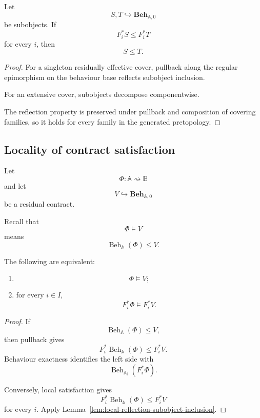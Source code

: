 \begin{lemma}
\label{lem:local-reflection-subobject-inclusion}
Let
\[
    S,T
    \hookrightarrow
    \mathbf{Beh}_{\mathbb A,0}
\]
be subobjects. If
\[
    F_i^\ast S
    \leq
    F_i^\ast T
\]
for every \(i\), then
\[
    S\leq T.
\]
\end{lemma}

\begin{proof}
For a singleton residually effective cover, pullback along the regular
epimorphism on the behaviour base reflects subobject inclusion.

For an extensive cover, subobjects decompose componentwise.

The reflection property is preserved under pullback and composition of
covering families, so it holds for every family in the generated
pretopology.
\end{proof}

\subsection{Locality of contract satisfaction}
\label{subsec:locality-contract-satisfaction-rigorous}

Let
\[
    \Phi:\mathbb A\rightsquigarrow\mathbb B
\]
and let
\[
    V\hookrightarrow\mathbf{Beh}_{\mathbb A,0}
\]
be a residual contract.

Recall that
\[
    \Phi\models V
\]
means
\[
    \operatorname{Beh}_{\mathbb A}(\Phi)\leq V.
\]

\begin{theorem}
\label{thm:locality-contract-satisfaction-rigorous}
The following are equivalent:
\begin{enumerate}
    \item
    \[
        \Phi\models V;
    \]
    \item for every \(i\in I\),
    \[
        F_i^\ast\Phi
        \models
        F_i^\ast V.
    \]
\end{enumerate}
\end{theorem}

\begin{proof}
If
\[
    \operatorname{Beh}_{\mathbb A}(\Phi)\leq V,
\]
then pullback gives
\[
    F_i^\ast
    \operatorname{Beh}_{\mathbb A}(\Phi)
    \leq
    F_i^\ast V.
\]
Behaviour exactness identifies the left side with
\[
    \operatorname{Beh}_{\mathbb A_i}(F_i^\ast\Phi).
\]

Conversely, local satisfaction gives
\[
    F_i^\ast
    \operatorname{Beh}_{\mathbb A}(\Phi)
    \leq
    F_i^\ast V
\]
for every \(i\). Apply
Lemma~\ref{lem:local-reflection-subobject-inclusion}.
\end{proof}

